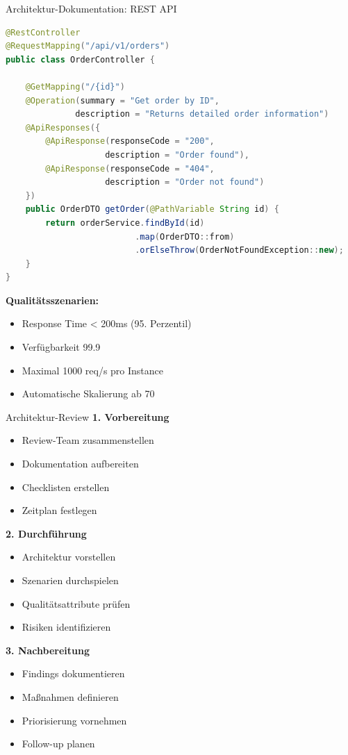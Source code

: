 \begin{example2}{Architektur-Dokumentation: REST API}
\begin{lstlisting}[language=Java, style=basesmol]
@RestController
@RequestMapping("/api/v1/orders")
public class OrderController {
    
    @GetMapping("/{id}")
    @Operation(summary = "Get order by ID",
              description = "Returns detailed order information")
    @ApiResponses({
        @ApiResponse(responseCode = "200", 
                    description = "Order found"),
        @ApiResponse(responseCode = "404", 
                    description = "Order not found")
    })
    public OrderDTO getOrder(@PathVariable String id) {
        return orderService.findById(id)
                          .map(OrderDTO::from)
                          .orElseThrow(OrderNotFoundException::new);
    }
}
\end{lstlisting}

\textbf{Qualitätsszenarien:}
\begin{itemize}
    \item Response Time < 200ms (95. Perzentil)
    \item Verfügbarkeit 99.9%
    \item Maximal 1000 req/s pro Instance
    \item Automatische Skalierung ab 70%
\end{itemize}
\end{example2}

\begin{KR}{Architektur-Review}
\textbf{1. Vorbereitung}
\begin{itemize}
    \item Review-Team zusammenstellen
    \item Dokumentation aufbereiten
    \item Checklisten erstellen
    \item Zeitplan festlegen
\end{itemize}

\textbf{2. Durchführung}
\begin{itemize}
    \item Architektur vorstellen
    \item Szenarien durchspielen
    \item Qualitätsattribute prüfen
    \item Risiken identifizieren
\end{itemize}

\textbf{3. Nachbereitung}
\begin{itemize}
    \item Findings dokumentieren
    \item Maßnahmen definieren
    \item Priorisierung vornehmen
    \item Follow-up planen
\end{itemize}
\end{KR}

